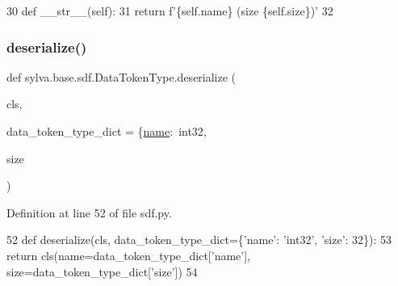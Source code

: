 \begin{DoxyCode}
30         \textcolor{keyword}{def }\_\_str\_\_(self):
31             \textcolor{keywordflow}{return} f\textcolor{stringliteral}{'\{self.name\} (size \{self.size\})'}
32 
\end{DoxyCode}
\mbox{\label{classsylva_1_1base_1_1sdf_1_1_data_token_type_a67288003df4678e9cb206773551a17c7}} 
\subsubsection{\texorpdfstring{deserialize()}{deserialize()}}
{\footnotesize\ttfamily def sylva.\+base.\+sdf.\+Data\+Token\+Type.\+deserialize (\begin{DoxyParamCaption}\item[{}]{cls,  }\item[{}]{data\+\_\+token\+\_\+type\+\_\+dict = {\ttfamily \{\textquotesingle{}\hyperlink{classsylva_1_1base_1_1sdf_1_1_data_token_type_a64214bba14fcba747fd608caef007924}{name}\textquotesingle{}\+:~\textquotesingle{}int32\textquotesingle{}},  }\item[{}]{size }\end{DoxyParamCaption})}



Definition at line 52 of file sdf.\+py.


\begin{DoxyCode}
52         \textcolor{keyword}{def }deserialize(cls, data\_token\_type\_dict=\{'name': \textcolor{stringliteral}{'int32'}, \textcolor{stringliteral}{'size'}: 32\}):
53             \textcolor{keywordflow}{return} cls(name=data\_token\_type\_dict[\textcolor{stringliteral}{'name'}], size=data\_token\_type\_dict[\textcolor{stringliteral}{'size'}])
54 
\end{DoxyCode}
\mbox{\label{classsylva_1_1base_1_1sdf_1_1_data_token_type_afa649c12af7f700e3c1f90b02e100d75}} 
